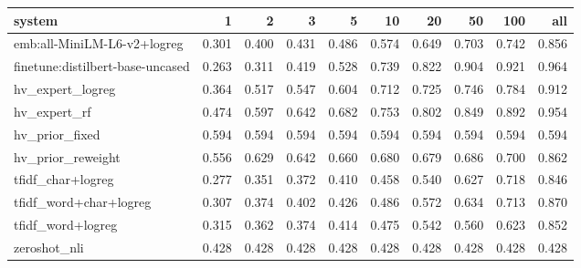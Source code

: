\begin{tabular}{lrrrrrrrrr}
\toprule
system & 1 & 2 & 3 & 5 & 10 & 20 & 50 & 100 & all \\
\midrule
emb:all-MiniLM-L6-v2+logreg & 0.301 & 0.400 & 0.431 & 0.486 & 0.574 & 0.649 & 0.703 & 0.742 & 0.856 \\
finetune:distilbert-base-uncased & 0.263 & 0.311 & 0.419 & 0.528 & 0.739 & 0.822 & 0.904 & 0.921 & 0.964 \\
hv\_expert\_logreg & 0.364 & 0.517 & 0.547 & 0.604 & 0.712 & 0.725 & 0.746 & 0.784 & 0.912 \\
hv\_expert\_rf & 0.474 & 0.597 & 0.642 & 0.682 & 0.753 & 0.802 & 0.849 & 0.892 & 0.954 \\
hv\_prior\_fixed & 0.594 & 0.594 & 0.594 & 0.594 & 0.594 & 0.594 & 0.594 & 0.594 & 0.594 \\
hv\_prior\_reweight & 0.556 & 0.629 & 0.642 & 0.660 & 0.680 & 0.679 & 0.686 & 0.700 & 0.862 \\
tfidf\_char+logreg & 0.277 & 0.351 & 0.372 & 0.410 & 0.458 & 0.540 & 0.627 & 0.718 & 0.846 \\
tfidf\_word+char+logreg & 0.307 & 0.374 & 0.402 & 0.426 & 0.486 & 0.572 & 0.634 & 0.713 & 0.870 \\
tfidf\_word+logreg & 0.315 & 0.362 & 0.374 & 0.414 & 0.475 & 0.542 & 0.560 & 0.623 & 0.852 \\
zeroshot\_nli & 0.428 & 0.428 & 0.428 & 0.428 & 0.428 & 0.428 & 0.428 & 0.428 & 0.428 \\
\bottomrule
\end{tabular}
